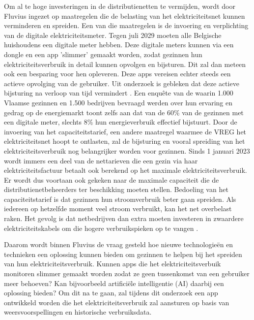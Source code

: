\documentclass{hogent-article}
\begin{document}
Om al te hoge investeringen in de distributienetten te vermijden, wordt door Fluvius ingezet op maatregelen die de belasting van het elektriciteitsnet kunnen verminderen en spreiden. Een van die maatregelen is de invoering en verplichting van de digitale elektriciteitsmeter. Tegen juli 2029 moeten alle Belgische huishoudens een digitale meter hebben. Deze digitale meters kunnen via een dongle en een app 'slimmer' gemaakt worden, zodat gezinnen hun elektriciteitsverbruik in detail kunnen opvolgen en bijsturen. Dit zal dan meteen ook een besparing voor hen opleveren. Deze apps vereisen echter steeds een actieve opvolging van de gebruiker. Uit onderzoek is gebleken dat deze actieve bijsturing na verloop van tijd vermindert \autocite{Wemyss2019}. Een enquête van de \textcite{VREG2021} waarin 1.000 Vlaamse gezinnen en 1.500 bedrijven bevraagd werden over hun ervaring en gedrag op de energiemarkt toont zelfs aan dat van de 60\% van de gezinnen met een digitale meter, slechts 8\% hun energieverbruik effectief bijstuurt. Door de invoering van het capaciteitstarief, een andere maatregel waarmee de VREG het elektriciteitsnet hoopt te ontlasten, zal de bijsturing en vooral spreiding van het elektriciteitsverbruik nog belangrijker worden voor gezinnen. Sinds 1 januari 2023 wordt immers een deel van de nettarieven die een gezin via haar elektriciteitsfactuur betaalt ook berekend op het maximale elektriciteitsverbruik. Er wordt dus voortaan ook gekeken naar de maximale capaciteit die de distributienetbeheerders ter beschikking moeten stellen. Bedoeling van het capaciteitstarief is dat gezinnen hun stroomverbruik beter gaan spreiden. Als iedereen op hetzelfde moment veel stroom verbruikt, kan het net overbelast raken. Het gevolg is dat netbedrijven dan extra moeten investeren in zwaardere elektriciteitskabels om die hogere verbruikspieken op te vangen \autocite{Selleslagh2022}.

Daarom wordt binnen Fluvius de vraag gesteld hoe nieuwe technologieën en technieken een oplossing kunnen bieden om gezinnen te helpen bij het spreiden van hun elektriciteitsverbruik. Kunnen apps die het elektriciteitsverbuik monitoren slimmer gemaakt worden zodat ze geen tussenkomst van een gebruiker meer behoeven? Kan bijvoorbeeld artificiële intelligentie (AI) daarbij een oplossing bieden? Om dit na te gaan, zal tijdens dit onderzoek een app ontwikkeld worden die het elektriciteitsverbruik zal aansturen op basis van weersvoorspellingen en historische verbruiksdata.

\bigskip
\bigskip
\bigskip
\bigskip
\bigskip
\bigskip
\bigskip
\bigskip
\bigskip
\bigskip
\bigskip
\bigskip
\bigskip
\bigskip
\bigskip
\bigskip
\bigskip
\bigskip
\bigskip
\end{document}
